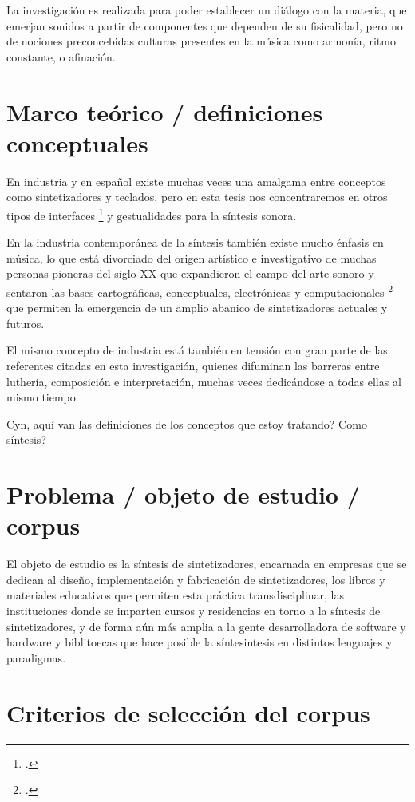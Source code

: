 \documentclass[../proyecto.tex]{subfiles}
\begin{document}
La investigación es realizada para poder establecer un diálogo con la materia, que emerjan sonidos a partir de componentes que dependen de su fisicalidad, pero no de nociones preconcebidas culturas presentes en la música como armonía, ritmo constante, o afinación.

\section{Marco teórico / definiciones conceptuales}

En industria y en español existe muchas veces una amalgama entre conceptos como sintetizadores y teclados, pero en esta tesis nos concentraremos en otros tipos de interfaces \footcite{bjorn_push_2021} y gestualidades para la síntesis sonora.

En la industria contemporánea de la síntesis  también existe mucho énfasis en música, lo que está divorciado del origen artístico e investigativo de muchas personas pioneras del siglo XX que expandieron el campo del arte sonoro y sentaron las bases cartográficas, conceptuales, electrónicas y computacionales \footcite{roads_computer_1996} que permiten la emergencia de un amplio abanico de sintetizadores actuales y futuros.

El mismo concepto de industria está también en tensión con gran parte de las referentes citadas en esta investigación, quienes difuminan las barreras entre luthería, composición e interpretación, muchas veces dedicándose a todas ellas al mismo tiempo.

Cyn, aquí van las definiciones de los conceptos que estoy tratando? Como síntesis?

\section{Problema / objeto de estudio / corpus}

El objeto de estudio es la síntesis de sintetizadores, encarnada en empresas que se dedican al diseño, implementación y fabricación de sintetizadores, los libros y materiales educativos que permiten esta práctica transdisciplinar, las instituciones donde se imparten cursos y residencias en torno a la síntesis de sintetizadores, y de forma aún más amplia a la gente desarrolladora de software y hardware y biblitoecas que hace posible la síntesintesis en distintos lenguajes y paradigmas.

\section{Criterios de selección del corpus}
\end{document}
